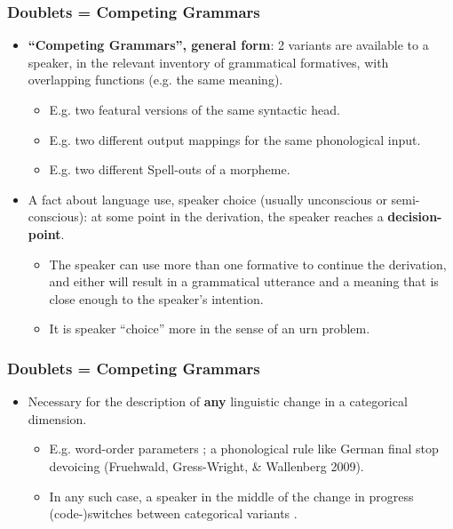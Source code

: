 \documentclass[hyperref={pdfpagelabels=false}]{beamer}
\begin{document}
\begin{frame}
\frametitle{Doublets = Competing Grammars \citep{kroch1994}}
\begin{itemize}
	\item[ ] \textbf{``Competing Grammars'', general form}: 2 variants are available to a speaker, in the relevant inventory of grammatical formatives, with overlapping functions (e.g. the same meaning).
		\begin{itemize}
			\item E.g. two featural versions of the same syntactic head. 
			\item E.g. two different output mappings for the same phonological input.
			\item E.g. two different Spell-outs of a morpheme.
		\end{itemize}
	\item A fact about language use, speaker choice (usually unconscious or semi-conscious): at some point in the derivation, the speaker reaches a \textbf{decision-point}.
		\begin{itemize}
		\item The speaker can use more than one formative to continue the derivation, and either will result in a grammatical utterance and a meaning that is close enough to the speaker's intention.
		\item It is speaker ``choice'' more in the sense of an urn problem.
		\end{itemize}
\end{itemize}
\end{frame}

\begin{frame}
\frametitle{Doublets = Competing Grammars}
\begin{itemize}
	\item Necessary for the description of \textbf{any} linguistic change in a categorical dimension.
		\begin{itemize} 
			\item E.g. word-order parameters \citep{pintzuk1991, santorini1992}; a phonological rule like German final stop devoicing (Fruehwald, Gress-Wright, \& Wallenberg 2009)\nocite{fruehwaldgresswallenberg}. 
			\item In any such case, a speaker in the middle of the change in progress (code-)switches between categorical variants \citep{kroch1989}.
		\end{itemize} 
\end{itemize}
\end{frame}
\end{document}

